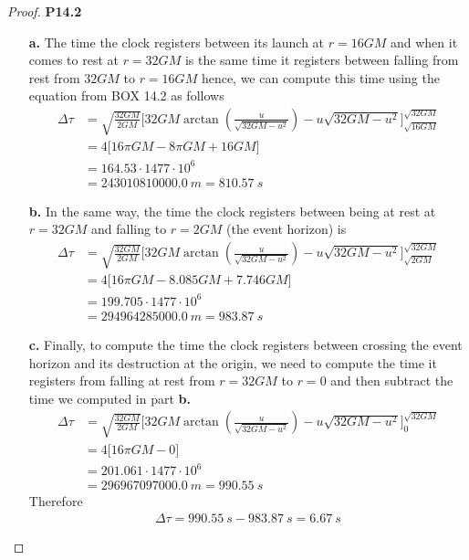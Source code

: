 \documentclass[11pt]{article}
\theoremstyle{definition}
\begin{document}
\cleardoublepage
\begin{proof}{\textbf{P14.2}}
\begin{itemize}
\item [\textbf{a.}] The time the clock registers between its launch at
$r = 16GM$ and when it comes to rest at $r = 32GM$ is the same time it
registers between falling from rest from $32GM$ to $r = 16GM$ hence,
we can compute this time using the equation from BOX 14.2 as follows
\begin{align*}
    \Delta \tau &= \sqrt{\frac{32GM}{2GM}}\bigg[
        32GM\arctan(\frac{u}{\sqrt{32GM - u^2}}) - u\sqrt{32GM - u^2}
    \bigg]_{\sqrt{16GM}}^{\sqrt{32GM}}\\
    &= 4\bigg[ 16\pi GM -  8\pi GM + 16GM \bigg]\\
    &= 164.53 \cdot 1477 \cdot 10^6\\
    &= 243010810000.0~m = 810.57~s
\end{align*}
\item [\textbf{b.}] In the same way, the time the clock registers between being
at rest at $r = 32GM$ and falling to $r = 2GM$ (the event horizon) is
\begin{align*}
    \Delta \tau &= \sqrt{\frac{32GM}{2GM}}\bigg[
        32GM\arctan(\frac{u}{\sqrt{32GM - u^2}}) - u\sqrt{32GM - u^2}
    \bigg]_{\sqrt{2GM}}^{\sqrt{32GM}}\\
    &= 4\bigg[ 16\pi GM - 8.085GM + 7.746GM \bigg]\\
    &= 199.705 \cdot 1477 \cdot 10^6\\
    &= 294964285000.0~m = 983.87~s
\end{align*}
\item [\textbf{c.}] Finally, to compute the time the clock registers between
crossing the event horizon and its destruction at the origin, we need to compute
the time it registers from falling at rest from $r=32GM$ to $r=0$ and then
subtract the time we computed in part \textbf{b.}
\begin{align*}
    \Delta \tau &= \sqrt{\frac{32GM}{2GM}}\bigg[
        32GM\arctan(\frac{u}{\sqrt{32GM - u^2}}) - u\sqrt{32GM - u^2}
    \bigg]_{0}^{\sqrt{32GM}}\\
    &= 4\bigg[ 16\pi GM - 0 \bigg]\\
    &= 201.061 \cdot 1477 \cdot 10^6\\
    &= 296967097000.0~m = 990.55~s
\end{align*}
Therefore 
\begin{align*}
    \Delta \tau = 990.55~s - 983.87~s = 6.67~s
\end{align*}


\end{itemize}
\end{proof}
\end{document}
